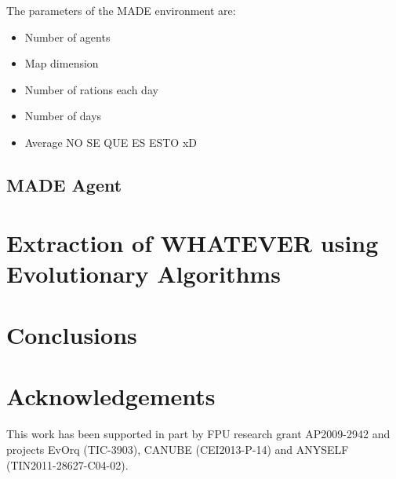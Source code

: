 \documentclass[runningheads]{llncs}
\begin{document}
The parameters of the MADE environment are:
\begin{itemize}
\item Number of agents
\item Map dimension
\item Number of rations each day
\item Number of days
\item Average NO SE QUE ES ESTO xD
\end{itemize}


\subsection{MADE Agent}




\section{Extraction of WHATEVER using Evolutionary Algorithms}
\label{sec:ea}




\section{Conclusions}
\label{sec:conclusion}



\section*{Acknowledgements}
This work has been supported in part by FPU research grant AP2009-2942 and projects EvOrq (TIC-3903), CANUBE (CEI2013-P-14) and ANYSELF (TIN2011-28627-C04-02).




\end{document}
